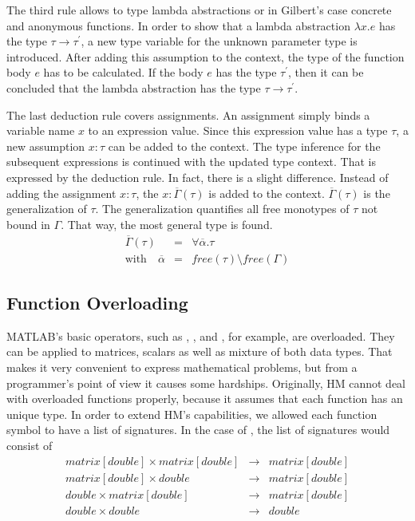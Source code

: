 The third rule allows to type lambda abstractions or in Gilbert's case concrete and anonymous functions.
In order to show that a lambda abstraction $\lambda x.e$ has the type $\tau\rightarrow \tau^\prime$, a new type variable for the unknown parameter type is introduced.
After adding this assumption to the context, the type of the function body $e$ has to be calculated.
If the body $e$ has the type $\tau^\prime$, then it can be concluded that the lambda abstraction has the type $\tau \rightarrow \tau^\prime$.

The last deduction rule covers assignments.
An assignment simply binds a variable name $x$ to an expression value.
Since this expression value has a type $\tau$, a new assumption $x:\tau$ can be added to the context.
The type inference for the subsequent expressions is continued with the updated type context.
That is expressed by the deduction rule.
In fact, there is a slight difference.
Instead of adding the assignment $x:\tau$, the $x:\overline{\Gamma}(\tau)$ is added to the context.
$\overline{\Gamma}(\tau)$ is the generalization of $\tau$.
The generalization quantifies all free monotypes of $\tau$ not bound in $\Gamma$.
That way, the most general type is found.
\begin{eqnarray*}
	\overline{\Gamma}(\tau) &=& \forall \overline{\alpha}. \tau\\
	\text{with}\quad\overline{\alpha} &=& free(\tau) \setminus free(\Gamma)
\end{eqnarray*}

\subsection{Function Overloading}

MATLAB's basic operators, such as \code{+}, \code{-}, \code{/} and \code{*}, for example, are overloaded.
They can be applied to matrices, scalars as well as mixture of both data types.
That makes it very convenient to express mathematical problems, but from a programmer's point of view it causes some hardships.
Originally, HM cannot deal with overloaded functions properly, because it assumes that each function has an unique type.
In order to extend HM's capabilities, we allowed each function symbol to have a list of signatures.
In the case of \code{+}, the list of signatures would consist of 
\begin{eqnarray*}
matrix[double] \times matrix[double] &\rightarrow& matrix[double]\\
matrix[double] \times double &\rightarrow& matrix[double]\\
double \times matrix[double] &\rightarrow& matrix[double]\\
double \times double &\rightarrow& double
\end{eqnarray*}

